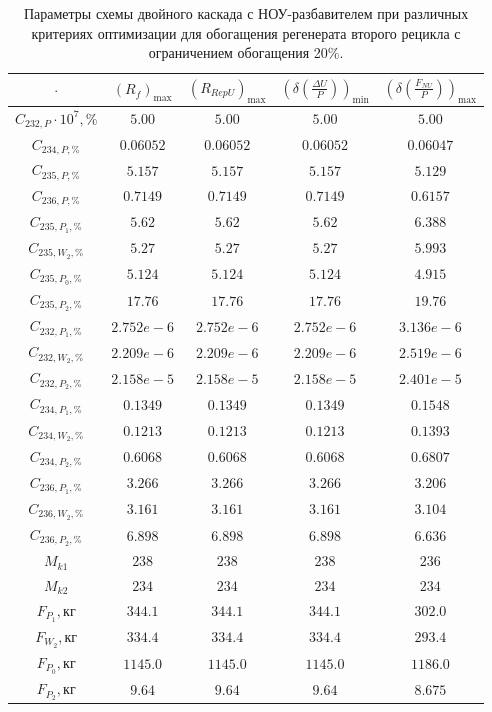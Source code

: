 \begin{table}
\begin{tabular}{ccccc}
    $\cdot$ & $(R_f)_\text{max}$ & $(R_{RepU})_\text{max}$ & $(\delta(\frac{\Delta U}{P}))_\text{min}$ & $(\delta(\frac{F_{NU}}{P}))_\text{max}$\\ \hline
    $C_{232,P}\cdot10^{7}, \%$ & $5.00$ & $5.00$ & $5.00$ & $5.00$\\ \hline
    $C_{234,P, \%}$ & $0.06052$ & $0.06052$ & $0.06052$ & $0.06047$\\ \hline
    $C_{235,P, \%}$ & $5.157$ & $5.157$ & $5.157$ & $5.129$\\ \hline
    $C_{236,P, \%}$ & $0.7149$ & $0.7149$ & $0.7149$ & $0.6157$\\ \hline
    $C_{235,P_1, \%}$ & $5.62$ & $5.62$ & $5.62$ & $6.388$\\ \hline
    $C_{235,W_2, \%}$ & $5.27$ & $5.27$ & $5.27$ & $5.993$\\ \hline
    $C_{235,P_0, \%}$ & $5.124$ & $5.124$ & $5.124$ & $4.915$\\ \hline
    $C_{235,P_2, \%}$ & $17.76$ & $17.76$ & $17.76$ & $19.76$\\ \hline
    $C_{232,P_1, \%}$ & $2.752e-6$ & $2.752e-6$ & $2.752e-6$ & $3.136e-6$\\ \hline
    $C_{232,W_2, \%}$ & $2.209e-6$ & $2.209e-6$ & $2.209e-6$ & $2.519e-6$\\ \hline
    $C_{232,P_2, \%}$ & $2.158e-5$ & $2.158e-5$ & $2.158e-5$ & $2.401e-5$\\ \hline
    $C_{234,P_1, \%}$ & $0.1349$ & $0.1349$ & $0.1349$ & $0.1548$\\ \hline
    $C_{234,W_2, \%}$ & $0.1213$ & $0.1213$ & $0.1213$ & $0.1393$\\ \hline
    $C_{234,P_2, \%}$ & $0.6068$ & $0.6068$ & $0.6068$ & $0.6807$\\ \hline
    $C_{236,P_1, \%}$ & $3.266$ & $3.266$ & $3.266$ & $3.206$\\ \hline
    $C_{236,W_2, \%}$ & $3.161$ & $3.161$ & $3.161$ & $3.104$\\ \hline
    $C_{236,P_2, \%}$ & $6.898$ & $6.898$ & $6.898$ & $6.636$\\ \hline
    $M_{k1}$ & $238$ & $238$ & $238$ & $236$\\ \hline
    $M_{k2}$ & $234$ & $234$ & $234$ & $234$\\ \hline
    $F_{P_1}, \text{кг}$ & $344.1$ & $344.1$ & $344.1$ & $302.0$\\ \hline
    $F_{W_2}, \text{кг}$ & $334.4$ & $334.4$ & $334.4$ & $293.4$\\ \hline
    $F_{P_0}, \text{кг}$ & $1145.0$ & $1145.0$ & $1145.0$ & $1186.0$\\ \hline
    $F_{P_2}, \text{кг}$ & $9.64$   & $9.64$ & $9.64$ & $8.675$\\ \hline
    \end{tabular}
\caption{Параметры схемы двойного каскада с НОУ-разбавителем при различных критериях оптимизации для обогащения регенерата второго рецикла с ограничением обогащения 20\%.{\label{2opt2_20}}}
\end{table}

